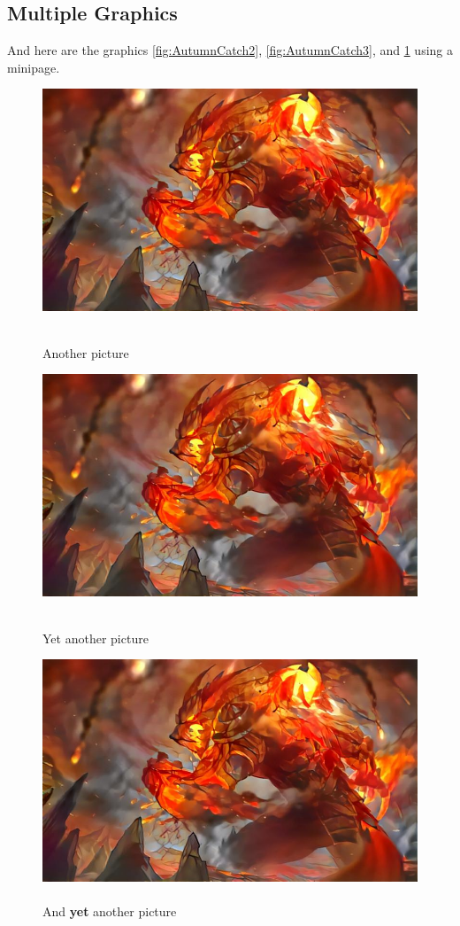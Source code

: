 \documentclass{scrartcl}
\begin{document}
\subsection{Multiple Graphics}
And here are the graphics \ref{fig:AutumnCatch2}, \ref{fig:AutumnCatch3}, and \ref{fig:AutumnCatch4} using a minipage.
\FloatBarrier
\noindent
\begin{figure}[H]
	\includegraphics[width=\linewidth]{Graphics/Herbstfang.jpg}
	\caption{\cite{mylatex}\\Another picture}\label{fig:AutumnCatch2}
	\endminipage\hfill
	\includegraphics[width=\linewidth]{Graphics/Herbstfang.jpg}
	\caption{\cite{mylatex}\\Yet another picture}\label{fig:AutumnCatch3}
	\endminipage\hfill
	\includegraphics[width=\linewidth]{Graphics/Herbstfang.jpg}
	\caption{\cite{mylatex}\\And \textbf{yet} another picture}\label{fig:AutumnCatch4}
	\endminipage
\end{figure}
\end{document}
